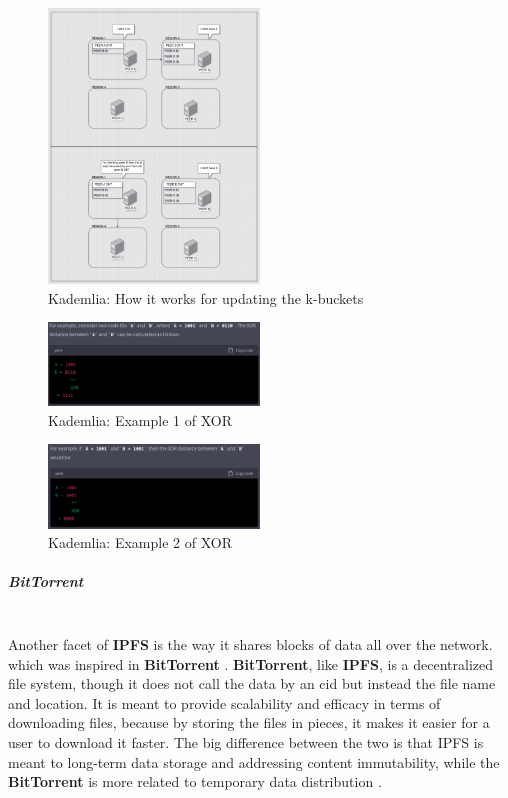 \begin{figure}[H]
    \centering
    \includegraphics[width=0.5\textwidth]{assets/use-case-1/DHT.png} %
    \caption{Kademlia: How it works for updating the k-buckets}
    \label{fig:sample-image} 
\end{figure}

\begin{figure}[H]
    \centering
    \includegraphics[width=0.5\textwidth]{assets/use-case-1/XOR1.png} %
    \caption{Kademlia: Example 1 of XOR}
    \label{fig:sample-image} 
\end{figure}

\begin{figure}[H]
    \centering
    \includegraphics[width=0.5\textwidth]{assets/use-case-1/XOR2.png} %
    \caption{Kademlia: Example 2 of XOR}
    \label{fig:sample-image} 
\end{figure}


\subparagraph{BitTorrent}\mbox{}\\
Another facet of \textbf{IPFS} is the way it shares blocks of data all over the network.
which was inspired in \textbf{BitTorrent} . \textbf{BitTorrent}, like \textbf{IPFS}, is a decentralized file system, though it does not call the data by an cid but instead the file name and
location. It is meant to provide scalability and efficacy in terms of downloading
files, because by storing the files in pieces, it makes it easier for a user to download
it faster. The big difference between the two is that IPFS is meant to long-term data storage and addressing content immutability, while the \textbf{BitTorrent} is more related to temporary data distribution \cite{bittorrent}.

